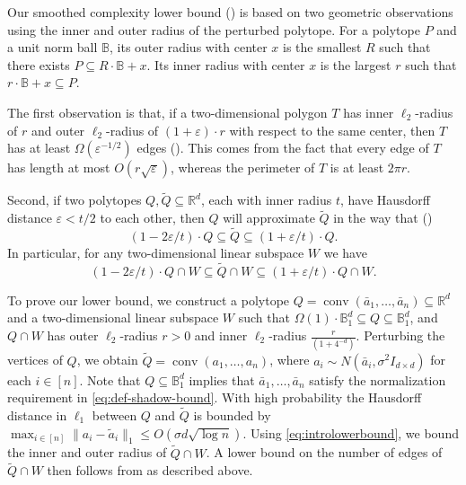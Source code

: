 \documentclass{article}\usepackage[a4paper,margin=20mm]{geometry}
\newcommand{\R}{\mathbb R}
\newcommand{\eps}{\varepsilon} %
\renewcommand{\epsilon}{\varepsilon} %
\newcommand{\conv}{\operatorname{conv}}
\renewcommand{\subset}{\subseteq}
\begin{document}
Our smoothed complexity lower bound () is based
on two geometric observations using the inner and outer radius of the perturbed polytope.
For a polytope $P$ and a unit norm ball $\mathbb{B}$, its outer radius with center $x$ is the smallest $R$ such that there exists  $P \subset R \cdot \mathbb{B} + x$.
Its inner radius with center $x$ is the largest $r$ such that $r \cdot \mathbb{B} + x \subset P$.

The first observation is that, if a two-dimensional polygon $T$ has
inner $\ell_2$-radius of $r$ and outer $\ell_2$-radius of $(1 + \epsilon) \cdot r$ with respect to the same center, then $T$ has
at least $\Omega(\epsilon^{-1/2})$ edges (). This comes
from the fact that every edge of $T$ has length at most $O(r\sqrt{\epsilon})$,
whereas the perimeter of $T$ is at least $2\pi r$.

Second, if two polytopes $Q, \tilde{Q} \subseteq \R^d$, each with inner radius $t$,
have Hausdorff distance $\epsilon < t/2$ to each other, 
then $Q$ will approximate $\tilde{Q}$ in the way that ()
$$(1 - 2\epsilon/t)\cdot Q \subseteq \tilde{Q} \subseteq (1 + \epsilon/t)\cdot Q.$$
In particular, for any two-dimensional linear subspace $W$ we have
\begin{equation}\label{eq:introlowerbound}
    (1 - 2\eps/t)\cdot Q \cap W \subseteq \tilde{Q} \cap W \subseteq (1 + \eps/t)\cdot Q \cap W.
\end{equation}

To prove our lower bound, we construct a polytope 
$Q = \conv(\bar{a}_1, \ldots, \bar{a}_n) \subset \R^d$
and a two-dimensional linear subspace $W$ such that
$\Omega(1) \cdot  \mathbb{B}^d_1 \subset Q \subset \mathbb{B}^d_1$,
and $Q \cap W$ has outer $\ell_2$-radius $r > 0$ and inner $\ell_2$-radius $\frac{r}{(1+4^{-d})}$.
Perturbing the vertices of $Q$, we obtain
$\tilde{Q} = \conv(a_1,\ldots, a_n)$, where $a_i \sim N(\bar a_i, \sigma^2 I_{d\times d})$ for each $i \in [n]$.
Note that $Q \subset \mathbb B_1^d$ implies that $\bar a_1,\dots,\bar a_n$ satisfy
the normalization requirement in \eqref{eq:def-shadow-bound}.
With high probability the Hausdorff distance in $\ell_1$ between $Q$ and $\tilde Q$ is bounded by
$\max_{i \in [n]} \|a_i - \tilde{a}_i\|_1 \leq O(\sigma d\sqrt{\log n})$.
Using \eqref{eq:introlowerbound}, we bound the inner and outer radius of $\tilde Q \cap W$.
A lower bound on the number of edges of $\tilde Q \cap W$ then follows from  as described above.
\end{document}
